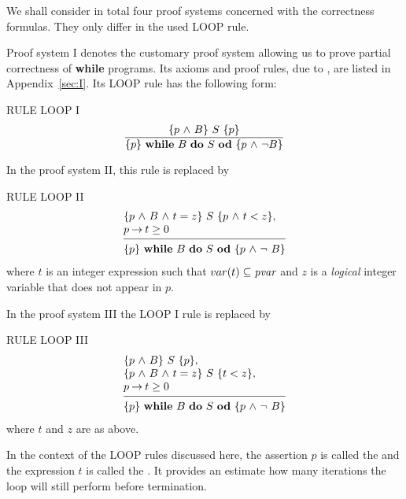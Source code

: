 \documentclass[runningheads]{llncs}       %
\begin{document}


We shall consider in total four proof systems concerned with the
correctness formulas. They only differ in the used LOOP rule.

Proof system I denotes the customary proof system allowing us to prove 
partial correctness of {\bf while} programs.  
Its axioms and proof rules, due to \cite{Hoa69}, are listed in Appendix~\ref{sec:I}.
Its LOOP rule has the following form:
\III

\NI
RULE LOOP I
\[ 
 \frac{ \mbox{$\{{p \mbox{$\ \wedge\ $} B}\}\ {S}\ \{{p}\}$}                }
      { \mbox{$\{{p}\}\ {\mbox{$\mbox{{\bf while}\ } {B}\ \mbox{{\bf do}\ } {S}\ \mbox{{\bf od}}$}}\ \{{p \mbox{$\ \wedge\ $} \neg B}\}$}  }
\]
\III


In the proof system II, this rule  is replaced by
\III

\NI
RULE LOOP II
\[
 \begin{array}{l}
  \HT{p \A B \A t=z}{S}{p \A t<z},          \\
  p \ra t \geq 0                           \\
  [-\medskipamount]
  \hrulefill                                \\
  \HT{p}{\WDD{B}{S}}{p \A \neg\ B}
 \end{array}
\]
where $t$ is an integer expression such that  $var(t)\subseteq \mbox{\it pvar}$
and $z$ is a \emph{logical} integer variable that does not appear in $p$.


\III

In the proof system III the  LOOP I rule is replaced by
\III

\NI
RULE \label{rul:loop2} LOOP III
\[
 \begin{array}{l}
  \HT{p \A B}{S}{p},                      \\
  \HT{p \A B \A t=z}{S}{t<z},             \\
  p \ra t \geq 0                         \\
  [-\medskipamount]
  \hrulefill                              \\
  \HT{p}{\WDD{B}{S}}{p \A \neg\ B}
 \end{array}
\]
%
\NI
where $t$ and $z$ are as above.

\III

In the context of the LOOP rules discussed here, 
the assertion $p$ is called the  and the expression $t$
is called the . It provides an estimate how
many iterations the loop will still perform before termination.
\end{document}
